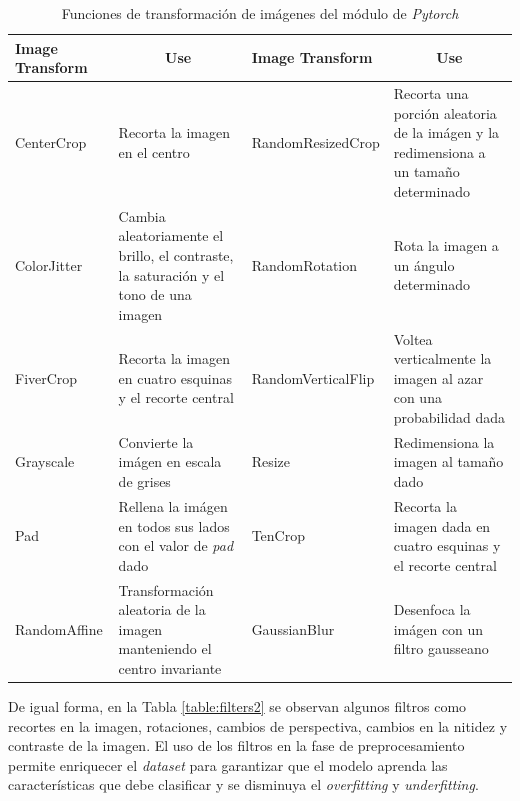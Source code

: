 \begin{table}[ht]
	\centering
	\begin{tabular}{|p{3cm}|p{4cm}|p{3.8cm}|p{4cm}|}
		\hline
		Image Transform       & \multicolumn{1}{c|}{Use}                                                               & Image Transform       & \multicolumn{1}{c|}{Use}                                                                        \\ \hline
		CenterCrop            & Recorta la imagen en el centro                                                         & RandomResizedCrop     & Recorta una porción aleatoria de la imágen y la redimensiona a un tamaño determinado            \\ \hline
		ColorJitter           & Cambia aleatoriamente el brillo, el contraste, la saturación y el tono de una imagen   & RandomRotation        & Rota la imagen a un ángulo determinado                                                          \\ \hline
		FiverCrop              & Recorta la imagen en cuatro esquinas y el recorte central                              & RandomVerticalFlip    & Voltea verticalmente la imagen al azar con una probabilidad dada                                \\ \hline
		Grayscale             & Convierte la imágen en escala de grises                                                & Resize                & Redimensiona la imagen al tamaño dado                                                           \\ \hline
		Pad                   & Rellena la imágen en todos sus lados con el valor de \textit{pad} dado                        & TenCrop               & Recorta la imagen dada en cuatro esquinas y el recorte central \\ \hline
		RandomAffine          & Transformación aleatoria de la imagen manteniendo el centro invariante            & GaussianBlur          & Desenfoca la imágen con un filtro gausseano                                                                                                                     \\ \hline
	\end{tabular}
	\caption{Funciones de transformación de imágenes del módulo de \textit{Pytorch}}
	\label{table:Filters1}
\end{table}

\vspace{0.5cm}

De igual forma, en la Tabla \ref{table:filters2} se observan algunos filtros como recortes en la imagen, rotaciones, cambios de perspectiva, cambios en la nitidez y contraste de la imagen. El uso de los filtros en la fase de preprocesamiento permite enriquecer el \textit{dataset} para garantizar que el modelo aprenda las características que debe clasificar y se disminuya el \textit{overfitting} y \textit{underfitting}.

